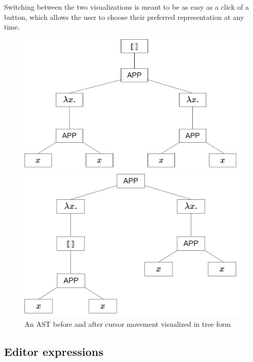 Switching between the two visualizations is meant to be as easy as a click of a
button, which allows the user to choose their preferred representation at any
time.

\begin{figure}
  \center
  \noindent\begin{minipage}{.45\textwidth}
    \center
    \includegraphics[width=\textwidth]{assets/ast_root_cursor.png}
  \end{minipage}\hfill
  \begin{minipage}{.45\textwidth}
    \center
    \includegraphics[width=\textwidth]{assets/ast_subtree_cursor.png}
  \end{minipage}\hfill
  \caption{An AST before and after cursor movement visualized in tree form}
  \label{fig:ast_visual_tree}
\end{figure}

\subsection{Editor expressions}

